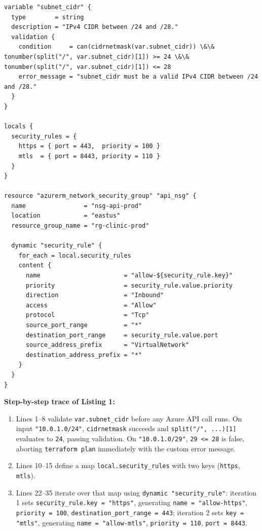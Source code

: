 \begin{lstlisting}[language=hcl, caption={HCL2 Dynamic NSG Rules and Input Validation}]
variable "subnet_cidr" {
  type        = string
  description = "IPv4 CIDR between /24 and /28."
  validation {
    condition     = can(cidrnetmask(var.subnet_cidr)) \&\& tonumber(split("/", var.subnet_cidr)[1]) >= 24 \&\& tonumber(split("/", var.subnet_cidr)[1]) <= 28
    error_message = "subnet_cidr must be a valid IPv4 CIDR between /24 and /28."
  }
}

locals {
  security_rules = {
    https = { port = 443,  priority = 100 }
    mtls  = { port = 8443, priority = 110 }
  }
}

resource "azurerm_network_security_group" "api_nsg" {
  name                = "nsg-api-prod"
  location            = "eastus"
  resource_group_name = "rg-clinic-prod"

  dynamic "security_rule" {
    for_each = local.security_rules
    content {
      name                       = "allow-${security_rule.key}"
      priority                   = security_rule.value.priority
      direction                  = "Inbound"
      access                     = "Allow"
      protocol                   = "Tcp"
      source_port_range          = "*"
      destination_port_range     = security_rule.value.port
      source_address_prefix      = "VirtualNetwork"
      destination_address_prefix = "*"
    }
  }
}
\end{lstlisting}

\textbf{Step-by-step trace of Listing 1:}
\begin{enumerate}[leftmargin=15pt]
  \item Lines 1--8 validate \texttt{var.subnet\_cidr} before any Azure API call runs. On input \texttt{"10.0.1.0/24"}, \texttt{cidrnetmask} succeeds and \texttt{split("/", ...)[1]} evaluates to \texttt{24}, passing validation. On \texttt{"10.0.1.0/29"}, \texttt{29 <= 28} is false, aborting \texttt{terraform plan} immediately with the custom error message.
  \item Lines 10--15 define a map \texttt{local.security\_rules} with two keys (\texttt{https}, \texttt{mtls}).
  \item Lines 22--35 iterate over that map using \texttt{dynamic "security\_rule"}: iteration 1 sets \texttt{security\_rule.key = "https"}, generating \texttt{name = "allow-https"}, \texttt{priority = 100}, \texttt{destination\_port\_range = 443}; iteration 2 sets \texttt{key = "mtls"}, generating \texttt{name = "allow-mtls"}, \texttt{priority = 110}, \texttt{port = 8443}.
\end{enumerate}


